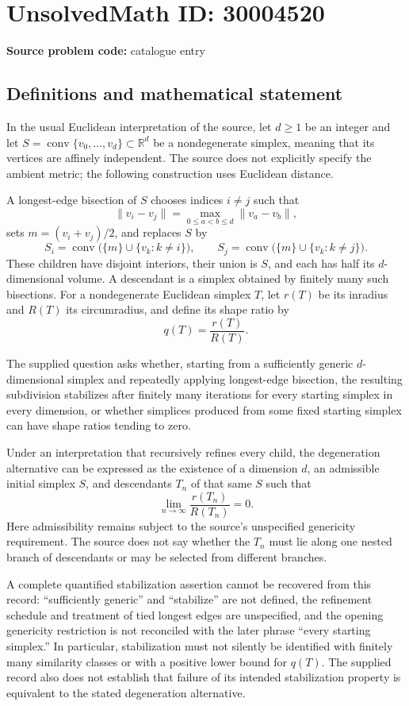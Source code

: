 \documentclass[11pt]{article}
\newcommand{\R}{\mathbb{R}}
\begin{document}
\section*{UnsolvedMath ID: 30004520}
\textbf{Source problem code:} catalogue entry
\subsection{Definitions and mathematical statement}
In the usual Euclidean interpretation of the source, let \(d\geq 1\) be an integer and let \(S=\operatorname{conv}\{v_0,\ldots,v_d\}\subset\R^d\) be a nondegenerate simplex, meaning that its vertices are affinely independent. The source does not explicitly specify the ambient metric; the following construction uses Euclidean distance.

A longest-edge bisection of \(S\) chooses indices \(i\ne j\) such that
\[
\lVert v_i-v_j\rVert=\max_{0\leq a<b\leq d}\lVert v_a-v_b\rVert,
\]
sets \(m=(v_i+v_j)/2\), and replaces \(S\) by
\[
S_i=\operatorname{conv}\bigl(\{m\}\cup\{v_k:k\ne i\}\bigr),\qquad
S_j=\operatorname{conv}\bigl(\{m\}\cup\{v_k:k\ne j\}\bigr).
\]
These children have disjoint interiors, their union is \(S\), and each has half its \(d\)-dimensional volume. A descendant is a simplex obtained by finitely many such bisections. For a nondegenerate Euclidean simplex \(T\), let \(r(T)\) be its inradius and \(R(T)\) its circumradius, and define its shape ratio by
\[
q(T)=\frac{r(T)}{R(T)}.
\]

The supplied question asks whether, starting from a sufficiently generic \(d\)-dimensional simplex and repeatedly applying longest-edge bisection, the resulting subdivision stabilizes after finitely many iterations for every starting simplex in every dimension, or whether simplices produced from some fixed starting simplex can have shape ratios tending to zero.

Under an interpretation that recursively refines every child, the degeneration alternative can be expressed as the existence of a dimension \(d\), an admissible initial simplex \(S\), and descendants \(T_n\) of that same \(S\) such that
\[
\lim_{n\to\infty}\frac{r(T_n)}{R(T_n)}=0.
\]
Here admissibility remains subject to the source's unspecified genericity requirement. The source does not say whether the \(T_n\) must lie along one nested branch of descendants or may be selected from different branches.

A complete quantified stabilization assertion cannot be recovered from this record: ``sufficiently generic'' and ``stabilize'' are not defined, the refinement schedule and treatment of tied longest edges are unspecified, and the opening genericity restriction is not reconciled with the later phrase ``every starting simplex.'' In particular, stabilization must not silently be identified with finitely many similarity classes or with a positive lower bound for \(q(T)\). The supplied record also does not establish that failure of its intended stabilization property is equivalent to the stated degeneration alternative.
\end{document}
